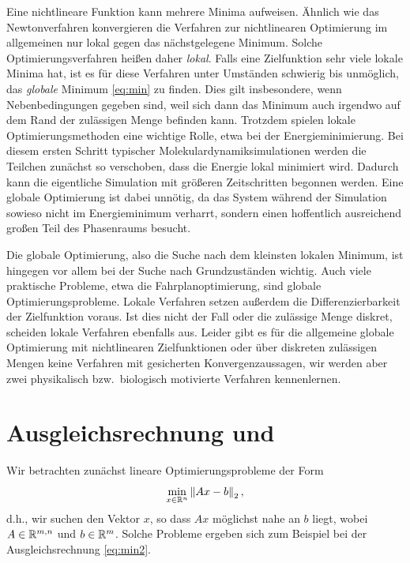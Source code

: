 Eine nichtlineare Funktion kann mehrere Minima aufweisen. Ähnlich wie
das Newtonverfahren konvergieren die Verfahren zur nichtlinearen
Optimierung im allgemeinen nur lokal gegen das nächstgelegene Minimum.
Solche Optimierungsverfahren heißen daher \emph{lokal}. Falls eine
Zielfunktion sehr viele lokale Minima hat, ist es für diese Verfahren
unter Umständen schwierig bis unmöglich, das \emph{globale} Minimum
\eqref{eq:min} zu finden. Dies gilt insbesondere, wenn
Nebenbedingungen gegeben sind, weil sich dann das Minimum auch
irgendwo auf dem Rand der zulässigen Menge befinden kann. Trotzdem
spielen lokale Optimierungsmethoden eine wichtige Rolle, etwa bei der
Energieminimierung. Bei diesem ersten Schritt typischer
Molekulardynamiksimulationen werden die Teilchen zunächst so
verschoben, dass die Energie lokal minimiert wird. Dadurch kann die
eigentliche Simulation mit größeren Zeitschritten begonnen
werden. Eine globale Optimierung ist dabei unnötig, da das System
während der Simulation sowieso nicht im Energieminimum verharrt,
sondern einen hoffentlich ausreichend großen Teil des Phasenraums
besucht.

Die globale Optimierung, also die Suche nach dem kleinsten lokalen
Minimum, ist hingegen vor allem bei der Suche nach Grundzuständen
wichtig. Auch viele praktische Probleme, etwa die Fahrplanoptimierung,
sind globale Optimierungsprobleme. Lokale Verfahren setzen außerdem
die Differenzierbarkeit der Zielfunktion voraus. Ist dies nicht der
Fall oder die zulässige Menge diskret, scheiden lokale Verfahren
ebenfalls aus. Leider gibt es für die allgemeine globale Optimierung
mit nichtlinearen Zielfunktionen oder über diskreten zulässigen Mengen
keine Verfahren mit gesicherten Konvergenzaussagen, wir werden aber
zwei physikalisch bzw.\ biologisch motivierte Verfahren kennenlernen.

\section{Ausgleichsrechnung und }

Wir betrachten zunächst lineare Optimierungsprobleme der Form
\begin{equation}
  \label{eq:optnorm2}
  \min_{x\in\mathbb{R}^n} \left\lVert{Ax-b}\right\rVert_2,
\end{equation}
d.h., wir suchen den Vektor $x$, so dass $Ax$ möglichst nahe an $b$
liegt, wobei $A\in\mathbb{R}^{m,n}$ und $b\in\mathbb{R}^{m}$.  Solche Probleme
ergeben sich zum Beispiel bei der Ausgleichsrechnung
\eqref{eq:min2}.

